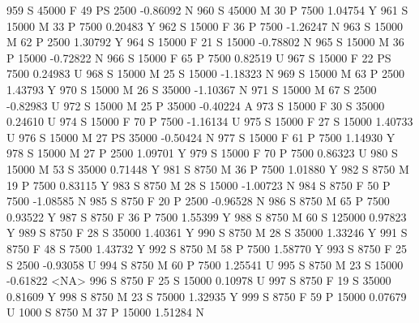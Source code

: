 \documentclass{article}
\begin{document}
\begin{Schunk}
\begin{Soutput}
959       S      45000   F  49        PS   2500  -0.86092    N
960       S      45000   M  30         P   7500   1.04754    Y
961       S      15000   M  33         P   7500   0.20483    Y
962       S      15000   F  36         P   7500  -1.26247    N
963       S      15000   M  62         P   2500   1.30792    Y
964       S      15000   F  21         S  15000  -0.78802    N
965       S      15000   M  36         P  15000  -0.72822    N
966       S      15000   F  65         P   7500   0.82519    U
967       S      15000   F  22        PS   7500   0.24983    U
968       S      15000   M  25         S  15000  -1.18323    N
969       S      15000   M  63         P   2500   1.43793    Y
970       S      15000   M  26         S  35000  -1.10367    N
971       S      15000   M  67         S   2500  -0.82983    U
972       S      15000   M  25         P  35000  -0.40224    A
973       S      15000   F  30         S  35000   0.24610    U
974       S      15000   F  70         P   7500  -1.16134    U
975       S      15000   F  27         S  15000   1.40733    U
976       S      15000   M  27        PS  35000  -0.50424    N
977       S      15000   F  61         P   7500   1.14930    Y
978       S      15000   M  27         P   2500   1.09701    Y
979       S      15000   F  70         P   7500   0.86323    U
980       S      15000   M  53         S  35000   0.71448    Y
981       S       8750   M  36         P   7500   1.01880    Y
982       S       8750   M  19         P   7500   0.83115    Y
983       S       8750   M  28         S  15000  -1.00723    N
984       S       8750   F  50         P   7500  -1.08585    N
985       S       8750   F  20         P   2500  -0.96528    N
986       S       8750   M  65         P   7500   0.93522    Y
987       S       8750   F  36         P   7500   1.55399    Y
988       S       8750   M  60         S 125000   0.97823    Y
989       S       8750   F  28         S  35000   1.40361    Y
990       S       8750   M  28         S  35000   1.33246    Y
991       S       8750   F  48         S   7500   1.43732    Y
992       S       8750   M  58         P   7500   1.58770    Y
993       S       8750   F  25         S   2500  -0.93058    U
994       S       8750   M  60         P   7500   1.25541    U
995       S       8750   M  23         S  15000  -0.61822 <NA>
996       S       8750   F  25         S  15000   0.10978    U
997       S       8750   F  19         S  35000   0.81609    Y
998       S       8750   M  23         S  75000   1.32935    Y
999       S       8750   F  59         P  15000   0.07679    U
1000      S       8750   M  37         P  15000   1.51284    N

\end{Soutput}
\end{Schunk}
\end{document}
